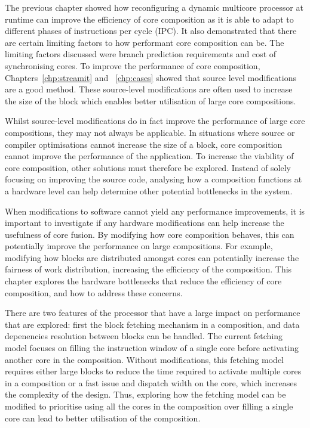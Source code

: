 The previous chapter showed how reconfiguring a dynamic multicore processor at runtime can improve the efficiency of core composition as it is able to adapt to different phases of instructions per cycle (IPC).
It also demonstrated that there are certain limiting factors to how performant core composition can be.
The limiting factors discussed were branch prediction requirements and cost of synchronising cores.
To improve the performance of core composition, Chapters~\ref{chp:streamit} and ~\ref{chp:cases} showed that source level modifications are a good method.
These source-level modifications are often used to increase the size of the block which enables better utilisation of large core compositions.

Whilst source-level modifications do in fact improve the performance of large core compositions, they may not always be applicable.
In situations where source or compiler optimisations cannot increase the size of a block, core composition cannot improve the performance of the application.
To increase the viability of core composition, other solutions must therefore be explored.
Instead of solely focusing on improving the source code, analysing how a composition functions at a hardware level can help determine other potential bottlenecks in the system.

When modifications to software cannot yield any performance improvements, it is important to investigate if any hardware modifications can help increase the usefulness of core fusion.
By modifying how core composition behaves, this can potentially improve the performance on large compositions.
For example, modifying how blocks are distributed amongst cores can potentially increase the fairness of work distribution, increasing the efficiency of the composition.
This chapter explores the hardware bottlenecks that reduce the efficiency of core composition, and how to address these concerns.

There are two features of the processor that have a large impact on performance that are explored: first the block fetching mechanism in a composition, and data depenencies resolution between blocks can be handled.
The current fetching model focuses on filling the instruction window of a single core before activating another core in the composition.
Without modifications, this fetching model requires either large blocks to reduce the time required to activate multiple cores in a composition or a fast issue and dispatch width on the core, which increases the complexity of the design.
Thus, exploring how the fetching model can be modified to prioritise using all the cores in the composition over filling a single core can lead to better utilisation of the composition.


